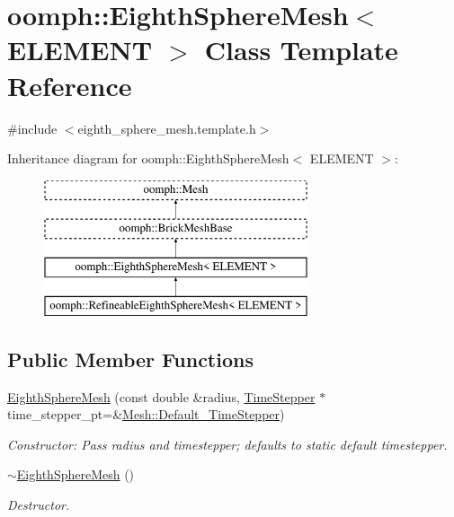 \hypertarget{classoomph_1_1EighthSphereMesh}{}\section{oomph\+:\+:Eighth\+Sphere\+Mesh$<$ E\+L\+E\+M\+E\+NT $>$ Class Template Reference}
\label{classoomph_1_1EighthSphereMesh}


{\ttfamily \#include $<$eighth\+\_\+sphere\+\_\+mesh.\+template.\+h$>$}

Inheritance diagram for oomph\+:\+:Eighth\+Sphere\+Mesh$<$ E\+L\+E\+M\+E\+NT $>$\+:\begin{figure}[H]
\begin{center}
\leavevmode
\includegraphics[height=4.000000cm]{classoomph_1_1EighthSphereMesh}
\end{center}
\end{figure}
\subsection*{Public Member Functions}
\begin{DoxyCompactItemize}
\item 
\hyperlink{classoomph_1_1EighthSphereMesh_a0457fc188d930a1e8853a3f0e1effbb3}{Eighth\+Sphere\+Mesh} (const double \&radius, \hyperlink{classoomph_1_1TimeStepper}{Time\+Stepper} $\ast$time\+\_\+stepper\+\_\+pt=\&\hyperlink{classoomph_1_1Mesh_a12243d0fee2b1fcee729ee5a4777ea10}{Mesh\+::\+Default\+\_\+\+Time\+Stepper})
\begin{DoxyCompactList}\small\item\em Constructor\+: Pass radius and timestepper; defaults to static default timestepper. \end{DoxyCompactList}\item 
\hyperlink{classoomph_1_1EighthSphereMesh_a425c3de92974d00dbb126f4cbbaf8e3b}{$\sim$\+Eighth\+Sphere\+Mesh} ()
\begin{DoxyCompactList}\small\item\em Destructor. \end{DoxyCompactList}\end{DoxyCompactItemize}
